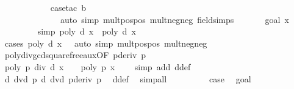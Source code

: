 \begin{isabellebody}
\ \ \ \ \ \ \ \ \ \ \isamarkupfalse%
\ {\isacharparenleft}{\isacharparenleft}case{\isacharunderscore}tac\ {\isachardoublequoteopen}b\ {\isachargreater}\ {}{\isachardoublequoteclose}{\isacharcomma}\ \isanewline
\ \ \ \ \ \ \ \ \ \ \ \ \ \ auto\ simp{\isacharcolon}\ mult{\isacharunderscore}pos{\isacharunderscore}pos\ mult{\isacharunderscore}neg{\isacharunderscore}neg\ field{\isacharunderscore}simps{\isacharparenright}\ {\isacharbrackleft}{\isacharbrackright}{\isacharparenright}{\isacharplus}\isanewline
\ \ \ \ \isamarkupfalse%
\ {\isacharparenleft}goal{}\ x{\isacharparenright}\isanewline
\ \ \ \ \ \ \isamarkupfalse%
\ \ {\isacharbrackleft}simp{\isacharbrackright}{\isacharcolon}\ {\isachardoublequoteopen}poly\ d\ x\ {\isacharasterisk}\ poly\ d\ x\ {\isachargreater}\ {}{\isachardoublequoteclose}\ \isanewline
\ \ \ \ \ \ \ \ \ \ \ \isamarkupfalse%
\ {\isacharparenleft}cases\ {\isachardoublequoteopen}poly\ d\ x\ {\isachargreater}\ {}{\isachardoublequoteclose}{\isacharcomma}\ auto\ simp{\isacharcolon}\ mult{\isacharunderscore}pos{\isacharunderscore}pos\ mult{\isacharunderscore}neg{\isacharunderscore}neg{\isacharparenright}\isanewline
\ \ \ \ \ \ \isamarkupfalse%
\ poly{\isacharunderscore}div{\isacharunderscore}gcd{\isacharunderscore}squarefree{\isacharunderscore}aux{\isacharparenleft}{}{\isacharparenright}{\isacharbrackleft}OF\ {\isacharbackquoteopen}pderiv\ p\ {\isasymnoteq}\ {}{\isacharbackquoteclose}{\isacharbrackright}\isanewline
\ \ \ \ \ \ \ \ \ \ \isamarkupfalse%
\ {\isachardoublequoteopen}poly\ {\isacharparenleft}p\ div\ d{\isacharparenright}\ x\ {\isacharequal}\ {}\ {\isasymlongleftrightarrow}\ poly\ p\ x\ {\isacharequal}\ {}{\isachardoublequoteclose}\ \isamarkupfalse%
\ {\isacharparenleft}simp\ add{\isacharcolon}\ d{\isacharunderscore}def{\isacharparenright}\isanewline
\ \ \ \ \ \ \isamarkupfalse%
\ \isamarkupfalse%
\ {\isachardoublequoteopen}d\ dvd\ p{\isachardoublequoteclose}\ {\isachardoublequoteopen}d\ dvd\ pderiv\ p{\isachardoublequoteclose}\ \isamarkupfalse%
\ d{\isacharunderscore}def\ \isamarkupfalse%
\ simp{\isacharunderscore}all\isanewline
\ \ \ \ \ \ \isamarkupfalse%
\ \isamarkupfalse%
\ {\isacharquery}case\ \isamarkupfalse%
\ goal{}\isanewline
\ \ \ \ \ \ \ \ \ \ \isamarkupfalse%

\end{isabellebody}
